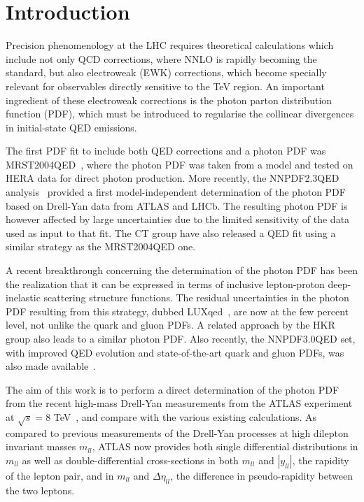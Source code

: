 \section{Introduction}

Precision phenomenology at the LHC requires theoretical calculations which
include not only QCD corrections, where NNLO is rapidly becoming
the standard, but also electroweak (EWK) corrections, which become
specially relevant for observables directly sensitive to the TeV region.
%
An important ingredient of these electroweak corrections is
the photon parton distribution function (PDF), which must
be introduced
to regularise the collinear divergences in initial-state QED emissions.

The first PDF fit to include both QED corrections and a photon PDF
was MRST2004QED~\cite{Martin:2004dh},
where the photon PDF was taken from a model
and tested on HERA data for direct photon production.
%
More recently, the NNPDF2.3QED analysis~\cite{Ball:2013hta}
provided a first model-independent
determination of the photon PDF based on Drell-Yan data
from ATLAS and LHCb.
%
The resulting photon PDF is however affected by large uncertainties
due to the limited sensitivity of the data used as input to that
fit.
%
The CT group have also released a QED fit using a similar strategy
as the MRST2004QED one.

A recent breakthrough concerning the determination of the
photon PDF has been the realization that it can be expressed
in terms of inclusive lepton-proton deep-inelastic scattering
structure functions.
%
The residual uncertainties in the photon PDF resulting from
this strategy, dubbed LUXqed~\cite{Manohar:2016nzj}, are now at the few percent level,
not unlike the quark and gluon PDFs.
%
A related approach by the HKR~\cite{Harland-Lang:2016apc}
group also leads to a similar photon PDF.
%
Also recently, the NNPDF3.0QED set, with improved
QED evolution and state-of-the-art quark and gluon
PDFs, was also made available~\cite{Bertone:2016ume,Ball:2014uwa}.

The aim of this work is to perform a direct determination
of the photon PDF from the recent high-mass Drell-Yan measurements
from the ATLAS experiment at $\sqrt{s}=8$ TeV~\cite{Aad:2016zzw},
and compare
with the various existing calculations.
%
As compared to previous measurements of the Drell-Yan processes
at high dilepton invariant masses $m_{ll}$, ATLAS now provides
both single differential distributions in $m_{ll}$ as well
as double-differential cross-sections in both $m_{ll}$
and $|y_{ll}|$, the rapidity of the lepton pair,
and in  $m_{ll}$ and $\Delta\eta_{ll}$, the difference in pseudo-rapidity
between the two leptons.

